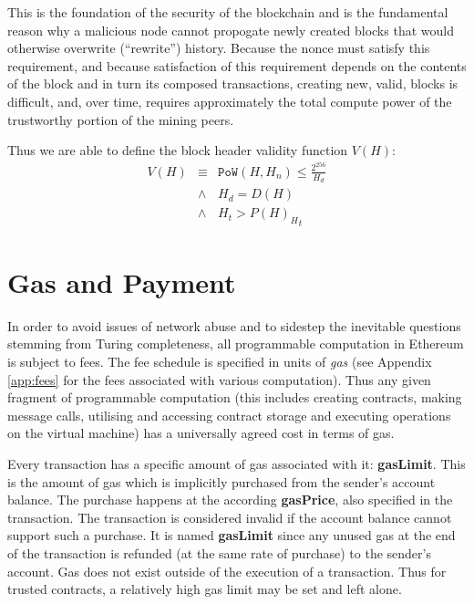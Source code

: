 \documentclass[9pt,oneside]{amsart}
\begin{document}
\begin{multicols}{2}
This is the foundation of the security of the blockchain and is the fundamental reason why a malicious node cannot propogate newly created blocks that would otherwise overwrite (``rewrite'') history. Because the nonce must satisfy this requirement, and because satisfaction of this requirement depends on the contents of the block and in turn its composed transactions, creating new, valid, blocks is difficult, and, over time, requires approximately the total compute power of the trustworthy portion of the mining peers.

Thus we are able to define the block header validity function $V(H)$:
\begin{eqnarray}
V(H) & \equiv & \mathtt{PoW}(H, H_n) \leqslant \frac{2^{256}}{H_d} \\
& \wedge & H_d = D(H) \\
& \wedge & H_t > {P(H)_H}_t
\end{eqnarray}

\section{Gas and Payment} \label{ch:payment}

In order to avoid issues of network abuse and to sidestep the inevitable questions stemming from Turing completeness, all programmable computation in Ethereum is subject to fees. The fee schedule is specified in units of \textit{gas} (see Appendix \ref{app:fees} for the fees associated with various computation). Thus any given fragment of programmable computation (this includes creating contracts, making message calls, utilising and accessing contract storage and executing operations on the virtual machine) has a universally agreed cost in terms of gas.

Every transaction has a specific amount of gas associated with it: \textbf{gasLimit}. This is the amount of gas which is implicitly purchased from the sender's account balance. The purchase happens at the according \textbf{gasPrice}, also specified in the transaction. The transaction is considered invalid if the account balance cannot support such a purchase. It is named \textbf{gasLimit} since any unused gas at the end of the transaction is refunded (at the same rate of purchase) to the sender's account. Gas does not exist outside of the execution of a transaction. Thus for trusted contracts, a relatively high gas limit may be set and left alone.


\end{multicols}
\end{document}
